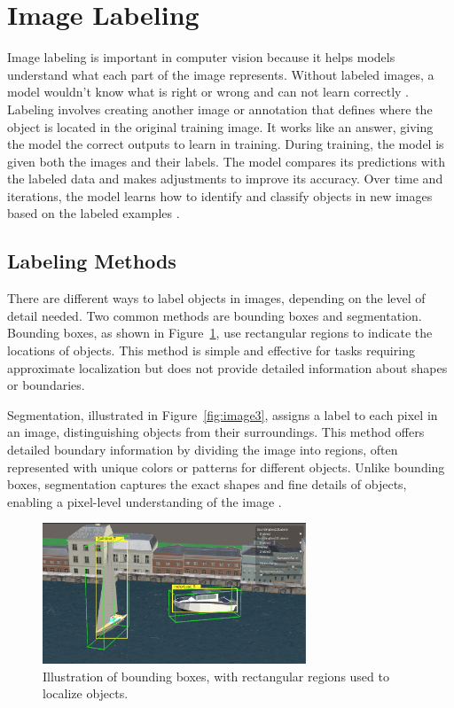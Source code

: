 \section{Image Labeling}
Image labeling is important in computer vision because it helps models understand what each part of the image represents. Without labeled images, a model wouldn’t know what is right or wrong and can not learn correctly \cite{Labelling}.\\

\noindent Labeling involves creating another image or annotation that defines where the object is located in the original training image. It works like an answer, giving the model the correct outputs to learn in training. During training, the model is given both the images and their labels. The model compares its predictions with the labeled data and makes adjustments to improve its accuracy. Over time and iterations, the model learns how to identify and classify objects in new images based on the labeled examples \cite{Labelling}.


\subsection{Labeling Methods}

There are different ways to label objects in images, depending on the level of detail needed. Two common methods are bounding boxes and segmentation.\\

\noindent Bounding boxes, as shown in Figure~\ref{fig:image2}, use rectangular regions to indicate the locations of objects. This method is simple and effective for tasks requiring approximate localization but does not provide detailed information about shapes or boundaries.\

\noindent Segmentation, illustrated in Figure~\ref{fig:image3}, assigns a label to each pixel in an image, distinguishing objects from their surroundings. This method offers detailed boundary information by dividing the image into regions, often represented with unique colors or patterns for different objects. Unlike bounding boxes, segmentation captures the exact shapes and fine details of objects, enabling a pixel-level understanding of the image \cite{labelingMethods}.\

\begin{figure}[H]
    \centering
    \includegraphics[width=0.7\textwidth]{Figures/boundingbox.png}
    \caption{Illustration of bounding boxes, with rectangular regions used to localize objects.}
    \label{fig:image2}
\end{figure}

